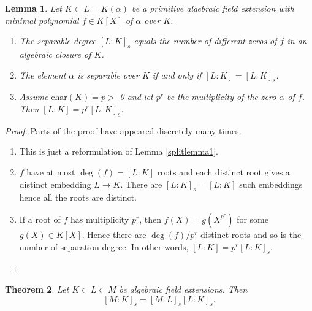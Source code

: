 \documentclass[12pt]{report}
\newtheorem{theorem}{Theorem}[section]
\newtheorem{lemma}[theorem]{Lemma}
\theoremstyle{definition}
\newcommand{\charr}{\text{char}}
\begin{document}
\begin{lemma}\label{seplem1}
	Let $K \subset L = K(\alpha)$ be a primitive algebraic field extension with minimal polynomial $f \in K[X]$ of $\alpha$ over $K$.
	\begin{enumerate}
		\item The separable degree $[L : K]_s$ equals the number of different zeros of $f$ in an algebraic closure of $K$.
		\item The element $\alpha$ is separable over $K$ if and only if $[L : K] = [L : K]_s$.
		\item Assume $\charr(K) = p >$ 0 and let $p^r$ be the multiplicity of the zero $\alpha$ of $f$. Then $[L:K] =  p^r [L:K]_s$.
	\end{enumerate}
\end{lemma}

\begin{proof}
	Parts of the proof have appeared discretely many times.
	\begin{enumerate}
		\item This is just a reformulation of Lemma \ref{splitlemma1}.
		\item $f$ have at most $\deg(f)=[L:K]$ roots and each distinct root gives a distinct embedding $L\to \overline{K}$. There are $[L : K]_s=[L : K]$ such embeddings hence all the roots are distinct.
		\item If a root of $f$ has multiplicity $p^r$, then $f(X)=g(X^{p^r})$ for some $g(X)\in K[X]$. Hence there are $\deg(f)/p^r$ distinct roots and so is the number of separation degree. In other words, $[L:K] =  p^r [L:K]_s$.
	\end{enumerate}
\end{proof}

\begin{theorem}\label{sepdeg}
	Let $K \subset L \subset M$ be algebraic field extensions. Then
	$$[M : K]_s = [M : L]_s [L : K]_s.$$
\end{theorem}
\end{document}
